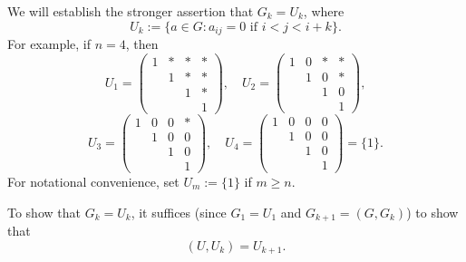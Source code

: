 \documentclass[reqno]{amsart} 
\begin{document}
\begin{itemize}
  We will establish the stronger assertion
  that $G_k = U_k$,
  where
  \begin{equation*}
  U_k := \{a \in G : a_{i j} = 0 \text{ if } i < j < i + k\}.
  \end{equation*}
  For example,
  if $n = 4$,
  then
  \begin{equation*}
  U_1 = 
\begin{pmatrix}
    1 & \ast & \ast & \ast \\
    & 1 & \ast & \ast  \\
    &  & 1 & \ast \\
    & & & 1
  \end{pmatrix}
,
  \quad 
  U_2 = 
\begin{pmatrix}
    1 & 0 & \ast & \ast \\
    & 1 & 0 & \ast  \\
    &  & 1 & 0 \\
    & & & 1
  \end{pmatrix}
,
  \end{equation*} 
\begin{equation*}
  U_3 = 
\begin{pmatrix}
    1 & 0 & 0 & \ast \\
    & 1 & 0 & 0  \\
    &  & 1 & 0 \\
    & & & 1
  \end{pmatrix}
,
  \quad 
  U_4 = 
\begin{pmatrix}
    1 & 0 & 0 & 0 \\
    & 1 & 0 & 0  \\
    &  & 1 & 0 \\
    & & & 1
  \end{pmatrix}
  = \{1\}.   
  \end{equation*}
  For notational convenience,
  set $U_m := \{1\}$ if $m \geq n$.

  To show that $G_k = U_k$,
  it suffices (since $G_1 = U_1$
  and $G_{k+1} = (G,G_k)$)
  to show
  that
  \begin{equation}
    (U,U_k) = U_{k+1}.
  \end{equation}


\end{itemize}
\end{document}
